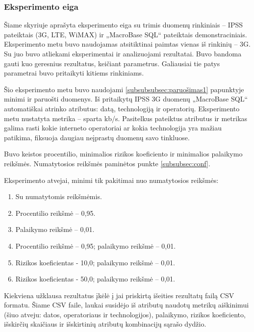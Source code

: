 \documentclass{VUMIFPSbakalaurinis}
\begin{document}
\subsubsection{Eksperimento eiga}
Šiame skyriuje aprašyta eksperimento eiga su trimis duomenų rinkiniais – IPSS pateiktais (3G, LTE, WiMAX) ir „MacroBase SQL“ pateiktais demonstraciniais. Eksperimento metu buvo naudojamas atsitiktinai paimtas vienas iš rinkinių – 3G. Su juo buvo atliekami eksperimentai ir analizuojami rezultatai. Buvo bandoma gauti kuo geresnius rezultatus, keičiant parametrus. Galiausiai tie patys parametrai buvo pritaikyti kitiems rinkiniams.

 \label{subsubsubsec:exp1}
Šio eksperimento metu buvo naudojami \ref{subsubsubsec:paruošimas1} papunktyje minimi ir paruošti duomenys. Iš pritaikytų IPSS 3G duomenų „MacroBase SQL“ automatiškai atrinko atributus: datą, technologiją ir operatorių. Eksperimento metu nustatyta metrika – sparta kb/s. Pasitelkus pateiktus atributus ir metrikas galima rasti kokie interneto operatoriai ar kokia technologija yra mažiau patikima, fiksuoja daugiau neįprastų duomenų savo tinkluose.\par

Buvo keistos procentilio, minimalios rizikos koeficiento ir minimalios palaikymo reikšmės. Numatytosios reikšmės paminėtos punkte \ref{subsubsec:conf}.\par

Eksperimento atvejai, minimi tik pakitimai nuo numatytosios reikšmės:
\begin{enumerate}
	\item Su numatytomis reikšmėmis.
	\item Procentilio reikšmė – 0,95.
	\item Palaikymo reikšmė – 0,01.
	\item Procentilio reikšmė – 0,95; palaikymo reikšmė – 0,01.
	\item Rizikos koeficientas - 10,0; palaikymo reikšmė – 0,01.
	\item Rizikos koeficientas - 50,0; palaikymo reikšmė – 0,01.
\end{enumerate}
Kiekviena užklausa rezultatus įkėlė į jai priskirtą išeities rezultatų failą CSV formatu. Šiame CSV faile, laukai susidėjo iš atributų naudotų metrikų aiškinimui (šiuo atveju: datos, operatoriaus ir technologijos), palaikymo, rizikos koeficiento, išskirčių skaičiaus ir išskirtinių atributų kombinacijų sąrašo dydžio.
\end{document}

